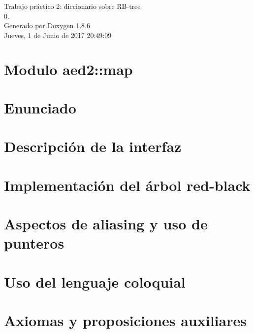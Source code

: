 \documentclass[twoside]{article}
\begin{document}
\hypersetup{pageanchor=false}
\begin{titlepage}
\vspace*{7cm}
\begin{center}%
{\Large Trabajo práctico 2\-: diccionario sobre R\-B-\/tree \\[1ex]\large 0. }\\
\vspace*{1cm}
{\large Generado por Doxygen 1.8.6}\\
\vspace*{0.5cm}
{\small Jueves, 1 de Junio de 2017 20:49:09}\\
\end{center}
\end{titlepage}
\tableofcontents
{}
\hypersetup{pageanchor=true}

\section{Modulo aed2\-:\-:map}
\label{index}\hypertarget{index}{}
\section{Enunciado}
\label{Enunciado}
\hypertarget{Enunciado}{}

\section{Descripción de la interfaz}
\label{Interfaz}
\hypertarget{Interfaz}{}

\section{Implementación del árbol red-\/black}
\label{Implementacion}
\hypertarget{Implementacion}{}

\section{Aspectos de aliasing y uso de punteros}
\label{Aliasing}
\hypertarget{Aliasing}{}

\section{Uso del lenguaje coloquial}
\label{Castellano}
\hypertarget{Castellano}{}

\section{Axiomas y proposiciones auxiliares}
\label{axiomas}
\hypertarget{axiomas}{}

\end{document}
